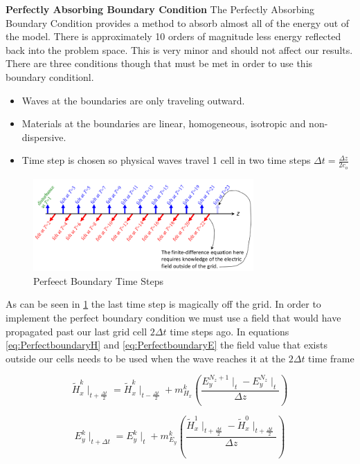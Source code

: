 \documentclass[a4paper,10pt]{article}
\begin{document}
\textbf{Perfectly Absorbing Boundary Condition}
The Perfectly Absorbing Boundary Condition provides a method to absorb almost all of the energy out of the model.  There is approximately 10 orders of magnitude less energy reflected back into the problem space.  This is very minor and should not affect our results.  There are three conditions though that must be met in order to use this boundary conditionl.
\begin{itemize}
\item Waves at the boundaries are only traveling outward.
\item Materials at the boundaries are linear, homogeneous, isotropic and non-dispersive.
\item Time step is chosen so physical waves travel 1 cell in two time steps $\Delta t=\frac{\Delta z}{2c_o}$
\end{itemize}

\begin{figure}[ht]
  \label{fig:PerfectBoundary}
   \centering
     \includegraphics[width=0.75\textwidth]{PerfectBoundary.png}
   \caption{Perfeect Boundary Time Steps}
\end{figure}

As can be seen in \ref{fig:PerfectBoundary} the last time step is magically off the grid.  In order to implement the perfect boundary condition we must use a field that would have propagated past our last grid cell $2\Delta t$ time steps ago.   In equations \eqref{eq:PerfectboundaryH} and \eqref{eq:PerfectboundaryE} the field value that exists outside our cells needs to be used when the wave reaches it at the $2\Delta t$ time frame

\begin{equation}
  \label{eq:PerfectboundaryH}
  \tilde{H}_{x}^{k}\mid_{t+\frac{\Delta t}{2}} = \tilde{H}_{x}^{k}\mid_{t-\frac{\Delta t}{2}} + m_{H_x}^{k}\left(\frac{E_{y}^{N_z+1}\mid_{t} - E_{y}^{N_z}\mid_{t}}{\Delta z}\right)
\end{equation}

\begin{equation}
  \label{eq:PerfectboundaryE}
  E_{y}^{k}\mid_{t+\Delta t} = E_{y}^{k}\mid_{t} + m_{E_y}^{k}\left(\frac{\tilde{H}_{x}^{1}\mid_{t+\frac{\Delta t}{2}} - \tilde{H}_{x}^{0}\mid_{t+\frac  {\Delta t}{2}}}{\Delta z}\right)
\end{equation}
\end{document}
